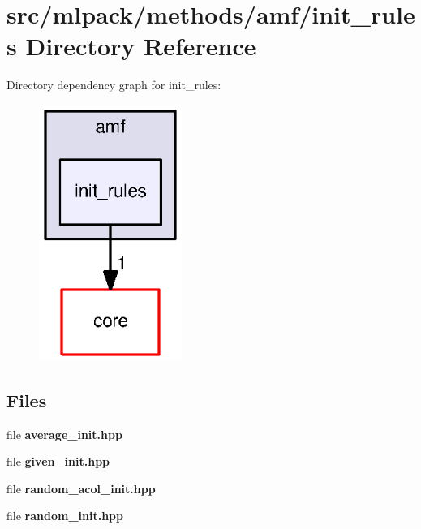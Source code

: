 \section{src/mlpack/methods/amf/init\+\_\+rules Directory Reference}
\label{dir_874bc73a472bc56857d75119e41021a1}
Directory dependency graph for init\+\_\+rules\+:
\nopagebreak
\begin{figure}[H]
\begin{center}
\leavevmode
\includegraphics[width=132pt]{dir_874bc73a472bc56857d75119e41021a1_dep}
\end{center}
\end{figure}
\subsection*{Files}
\begin{DoxyCompactItemize}
\item 
file {\bf average\+\_\+init.\+hpp}
\item 
file {\bf given\+\_\+init.\+hpp}
\item 
file {\bf random\+\_\+acol\+\_\+init.\+hpp}
\item 
file {\bf random\+\_\+init.\+hpp}
\end{DoxyCompactItemize}

